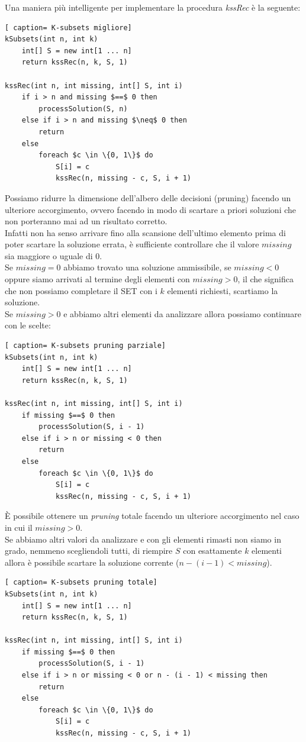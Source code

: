 \documentclass[../cheatSheetAlgoritmi.tex]{subfiles}
\begin{document}
\newpage
\begin{flushleft}
Una maniera più intelligente per implementare la procedura \emph{kssRec} è la seguente:
\end{flushleft}
\begin{lstlisting}[ caption= K-subsets migliore]
kSubsets(int n, int k)
	int[] S = new int[1 ... n]
	return kssRec(n, k, S, 1)

kssRec(int n, int missing, int[] S, int i)
	if i > n and missing $==$ 0 then
		processSolution(S, n)
	else if i > n and missing $\neq$ 0 then
		return 
	else
		foreach $c \in \{0, 1\}$ do
			S[i] = c
			kssRec(n, missing - c, S, i + 1)
\end{lstlisting}
Possiamo ridurre la dimensione dell'albero delle decisioni (pruning) facendo un ulteriore accorgimento, ovvero facendo in  modo di scartare a priori soluzioni che non porteranno mai ad un risultato corretto. \\
Infatti non ha senso arrivare fino alla scansione dell'ultimo elemento prima di poter scartare la soluzione errata, è sufficiente controllare che il valore $missing$ sia maggiore o uguale di $0$. \\
Se $missing = 0$ abbiamo trovato una soluzione ammissibile, se $missing < 0$ oppure siamo arrivati al termine degli elementi con $missing > 0$, il che significa che non possiamo completare il SET con i $k$ elementi richiesti, scartiamo la soluzione. \\
Se $missing > 0$ e abbiamo altri elementi da analizzare allora possiamo continuare con le scelte:
 \begin{lstlisting}[ caption= K-subsets pruning parziale]
kSubsets(int n, int k)
	int[] S = new int[1 ... n]
	return kssRec(n, k, S, 1)

kssRec(int n, int missing, int[] S, int i)
	if missing $==$ 0 then
		processSolution(S, i - 1)
	else if i > n or missing < 0 then
		return 
	else
		foreach $c \in \{0, 1\}$ do
			S[i] = c
			kssRec(n, missing - c, S, i + 1)
\end{lstlisting}
È 	possibile ottenere un \emph{pruning} totale facendo un ulteriore accorgimento nel caso in cui il $missing > 0$. \\
Se abbiamo altri valori da analizzare e con gli elementi rimasti non siamo in grado, nemmeno scegliendoli tutti, di riempire $S$ con esattamente $k$ elementi allora è possibile scartare la soluzione corrente ($n - (i - 1) < missing$).  
\newpage
 \begin{lstlisting}[ caption= K-subsets pruning totale]
kSubsets(int n, int k)
	int[] S = new int[1 ... n]
	return kssRec(n, k, S, 1)

kssRec(int n, int missing, int[] S, int i)
	if missing $==$ 0 then
		processSolution(S, i - 1)
	else if i > n or missing < 0 or n - (i - 1) < missing then
		return 
	else
		foreach $c \in \{0, 1\}$ do
			S[i] = c
			kssRec(n, missing - c, S, i + 1)
\end{lstlisting}
\end{document}
